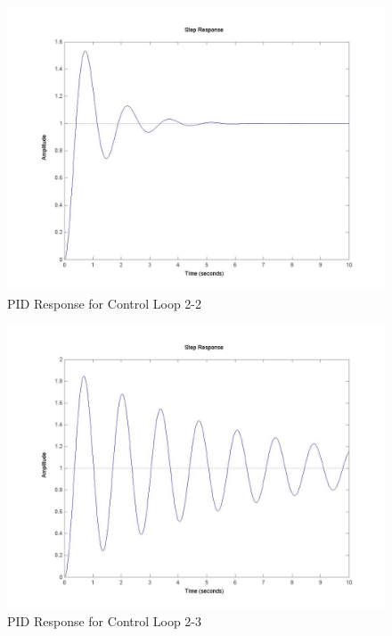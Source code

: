 	\begin{figure}[H]
		\includegraphics[width=\textwidth]{part2-2.jpg}
		\caption{PID Response for Control Loop 2-2}
	\end{figure}
	
	\begin{figure}[H]
		\includegraphics[width=\textwidth]{part2-3.jpg}
		\caption{PID Response for Control Loop 2-3}
	\end{figure}
	
